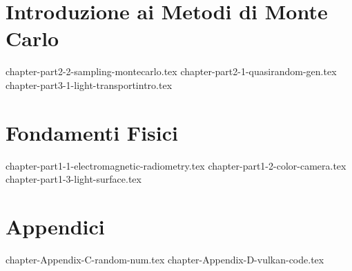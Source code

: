 \documentclass[10pt, openany]{book}
\theoremstyle{theoremdd}
\begin{document}
	\tableofcontents

	\mainmatter
	\part{Introduzione ai Metodi di Monte Carlo}
	{chapter-part2-2-sampling-montecarlo.tex}
	{chapter-part2-1-quasirandom-gen.tex}
	{chapter-part3-1-light-transportintro.tex}

	\part{Fondamenti Fisici}
	{chapter-part1-1-electromagnetic-radiometry.tex}
	{chapter-part1-2-color-camera.tex}
	{chapter-part1-3-light-surface.tex}

	\part{Appendici}
	\appendix
	{chapter-Appendix-C-random-num.tex}
	{chapter-Appendix-D-vulkan-code.tex}

	\backmatter
	\printbibliography

	\printglossaries
\end{document}
